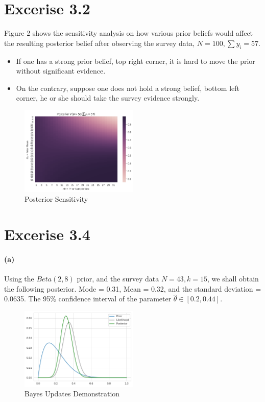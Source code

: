 \documentclass[11pt, letterpaper]{article}
\begin{document}
\section{Excerise 3.2}
Figure 2 shows the sensitivity analysis on how various prior beliefs would affect the resulting posterior belief after
observing the survey data, $N=100, \sum y_i = 57$.
\begin{itemize}
    \item If one has a strong prior belief, top right corner, it is hard to move the prior without significant evidence.
    \item On the contrary, suppose one does not hold a strong belief, bottom left corner, he or she should take the survey evidence strongly.
\end{itemize}

\begin{figure}[h]
    \centering
    \includegraphics[width=0.5\textwidth]{hw2_3.2.png}
    \caption{Posterior Sensitivity}
\end{figure}


\section{Excerise 3.4}
\paragraph{(a)}
Using the $Beta(2, 8)$ prior, and the survey data $N = 43, k = 15$, we shall obtain the following posterior.
Mode = 0.31, Mean = 0.32,  and the standard deviation = 0.0635.
The 95$\%$ confidence interval of the parameter $\hat{\theta} \in [0.2, 0.44]$.

\begin{figure}[h]
    \captionsetup{justification=centering, margin=2cm}
    \centering
    \includegraphics[width=0.5\textwidth]{hw2_3.4.png}
    \caption{Bayes Updates Demonstration}
\end{figure}
\end{document}
